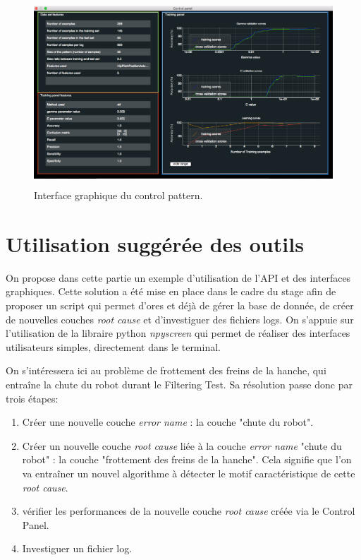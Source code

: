 \begin{figure}[H]
	\centering\includegraphics[height=7cm]{images/control_panel.png}
	\caption[Interface graphique du control pattern]{Interface graphique du control pattern.}
	\label{fig:Interface graphique du control pattern}
\end{figure}

\section{Utilisation suggérée des outils}
\label{Industrialisation du produit: Utilisation suggérée des outils}
On propose dans cette partie un exemple d'utilisation de l'API et des interfaces graphiques. Cette solution a été mise en place dans le cadre du stage afin de proposer un script qui permet d'ores et déjà de gérer la base de donnée, de créer de nouvelles couches \emph{root cause} et d'investiguer des fichiers logs. On s'appuie sur l'utilisation de la libraire python \emph{npyscreen} \cite{Npyscreen} qui permet de réaliser des interfaces utilisateurs simples, directement dans le terminal.
\newline

On s'intéressera ici au problème de frottement des freins de la hanche, qui entraîne la chute du robot durant le Filtering Test. Sa résolution passe donc par trois étapes: 
\begin{enumerate}
	\item Créer une nouvelle couche \emph{error name} : la couche "chute du robot". 
	\item Créer un nouvelle couche \emph{root cause} liée à la couche \emph{error name} "chute du robot" : la couche "frottement des freins de la hanche". Cela signifie que l'on va entraîner un nouvel algorithme à détecter le motif caractéristique de cette \emph{root cause}. 
	\item vérifier les performances de la nouvelle couche \emph{root cause} créée via le Control Panel.
	\item Investiguer un fichier log. 
\end{enumerate}

